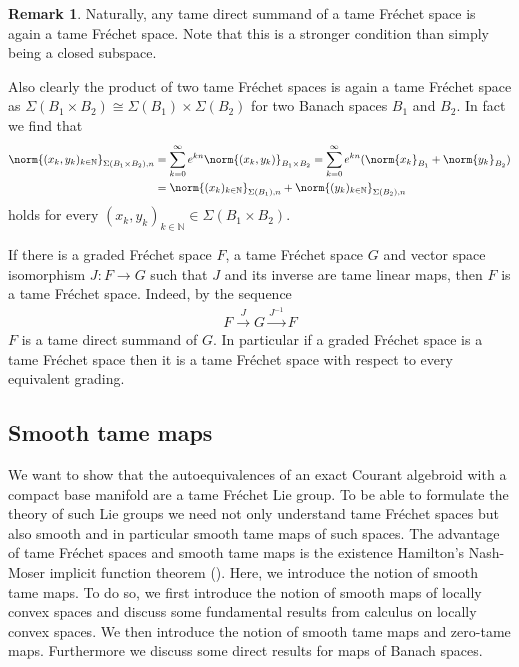 \documentclass[12pt,a4paper]{article}
\theoremstyle{plain}
\theoremstyle{definition}
\newtheorem{remark}[theorem]{Remark}
\newcommand{\N}{\mathbb{N}}
\newcommand{\nnorm}[2]{\norm{#1}_{#2}}
\begin{document}
\begin{remark}
\label{Rem:DirSumm&ProdAreTame}
Naturally, any tame direct summand of a tame Fréchet space is again a tame Fréchet space. Note that this is a stronger condition than simply being a closed subspace.

Also clearly the product of two tame Fréchet spaces is again a tame Fréchet space as $\Sigma(B_1\times B_2)\cong \Sigma(B_1)\times \Sigma(B_2)$ for two Banach spaces $B_1$ and $B_2$. In fact we find that 
\begin{align*}
    \nnorm{(x_k,y_k)_{k\in\N}}{\Sigma(B_1\times B_2),n}&=\sum_{k=0}^\infty e^{kn}\nnorm{(x_k,y_k)}{B_1\times B_2}=\sum_{k=0}^\infty e^{kn}(\nnorm{x_k}{B_1}+\nnorm{y_k}{B_2})\\
    &=\nnorm{(x_k)_{k\in \N}}{\Sigma(B_1),n}+\nnorm{(y_k)_{k\in \N}}{\Sigma(B_2),n}
\end{align*}
holds for every $(x_k,y_k)_{k\in \N}\in \Sigma(B_1\times B_2)$.

If there is a graded Fréchet space $F$, a tame Fréchet space $G$ and vector space isomorphism $J:F\to G$ such that $J$ and its inverse are tame linear maps, then $F$ is a tame Fréchet space. Indeed, by the sequence 
\begin{align*}
    F\xrightarrow{J}G\xrightarrow{J^{-1}}F
\end{align*}
$F$ is a tame direct summand of $G$. In particular if a graded Fréchet space is a tame Fréchet space then it is a tame Fréchet space with respect to every equivalent grading.
\end{remark}



\subsection{Smooth tame maps}

We want to show that the autoequivalences of an exact Courant algebroid with a compact base manifold are a tame Fréchet Lie group. To be able to formulate the theory of such Lie groups we need not only understand tame Fréchet spaces but also smooth and in particular smooth tame maps of such spaces.
The advantage of tame Fréchet spaces and smooth tame maps is the existence Hamilton's Nash-Moser implicit function theorem (\cite{hamilton}). 
Here, we introduce the notion of smooth tame maps. To do so, we first introduce the notion of smooth maps of locally convex spaces and discuss some fundamental results from calculus on locally convex spaces. We then introduce the notion of smooth tame maps and zero-tame maps. Furthermore we discuss some direct results for maps of Banach spaces.
\end{document}
